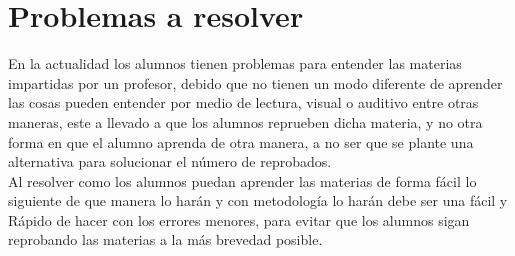 \documentclass[letterpaper,oneside,openany,11pt]{book}
\begin{document}




\chapter{Problemas a resolver}\label{cap.problemasresolver}
\noindent En la actualidad los alumnos tienen problemas para entender las materias impartidas por un profesor, debido que no tienen un modo diferente de aprender las cosas pueden entender por medio de lectura, visual o auditivo entre otras maneras, este a llevado a que los alumnos reprueben dicha materia, y no otra forma en que el alumno aprenda de otra manera, a no ser que se plante una alternativa para solucionar el número de reprobados. \\

Al resolver como los alumnos puedan aprender las materias de forma fácil lo siguiente de que manera lo harán y con metodología lo harán debe ser una fácil y Rápido de hacer con los errores menores, para evitar que los alumnos sigan reprobando las materias a la más brevedad posible.\\


\end{document}
